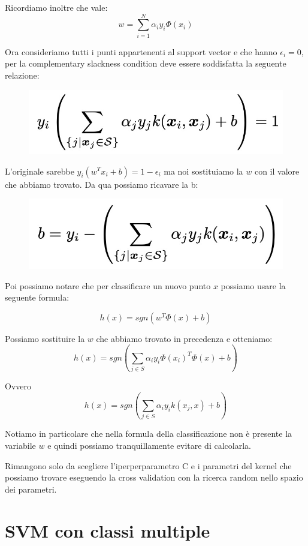 \documentclass[14pt]{extreport}
\begin{document}
Ricordiamo inoltre che vale: $$w = \sum_{i=1}^N \alpha_i y_i \Phi(x_i)$$

Ora consideriamo tutti i punti appartenenti al support vector e che hanno $\epsilon_i = 0$, per la complementary slackness condition deve essere
soddisfatta la seguente relazione:

\begin{figure}[H]
\centering
\includegraphics[width=0.7\linewidth]{352.jpeg}
\end{figure}

L'originale sarebbe $y_i(w^T x_i +b) = 1 - \epsilon_i$ ma noi sostituiamo la $w$ con il valore che abbiamo trovato. Da qua possiamo ricavare la b:

\begin{figure}[H]
\centering
\includegraphics[width=0.7\linewidth]{353.jpeg}
\end{figure}

Poi possiamo notare che per classificare un nuovo punto \textbf{$x$} possiamo usare la seguente formula:

$$h(x) = sgn(w^T\Phi(x)+b)$$

Possiamo sostituire la $w$ che abbiamo trovato in precedenza e otteniamo: $$h(x) = sgn(\sum_{j \in S}\alpha_i y_i \Phi(x_i)^T \Phi(x) + b)$$

Ovvero $$h(x) = sgn(\sum_{j \in S}\alpha_i y_i k(x_j, x) + b)$$

Notiamo in particolare che nella formula della classificazione non è presente la variabile $w$ e quindi possiamo tranquillamente evitare di
calcolarla.

Rimangono solo da scegliere l'iperperparametro C e i parametri del kernel che possiamo trovare eseguendo la cross validation con la ricerca random
nello spazio dei parametri.

\section{SVM con classi multiple}
\end{document}
